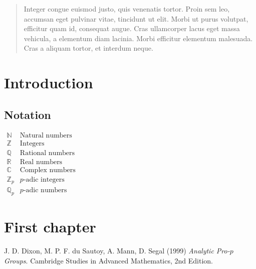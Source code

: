 \documentclass[11pt,a4paper,openany]{memoir}
\begin{document}
\vspace{1cm}

\renewcommand{\abstractname}{Zusammenfassung}
\begin{abstract}
Integer congue euismod justo, quis venenatis tortor. Proin sem leo, accumsan eget pulvinar vitae, tincidunt ut elit. Morbi ut purus volutpat, efficitur quam id, consequat augue. Cras ullamcorper lacus eget massa vehicula, a elementum diam lacinia. Morbi efficitur elementum malesuada. Cras a aliquam tortor, et interdum neque.
\end{abstract}
\vfill
\clearpage

\mainmatter
{} 
\setcounter{page}{5}
\tableofcontents

\chapter{Introduction}

\clearpage

\section{Notation}

$\begin{array}{ll}
\mathbb{N} & \text{Natural numbers} \\
\mathbb{Z} & \text{Integers}\\
\mathbb{Q} & \text{Rational numbers}\\
\mathbb{R} & \text{Real numbers}\\
\mathbb{C} & \text{Complex numbers}\\
\mathbb{Z}_p & \text{$p$-adic integers}\\
\mathbb{Q}_p & \text{$p$-adic numbers}
\end{array}$

\chapter{First chapter}

\begin{thebibliography}{99999999}

	J. D. Dixon, M. P. F. du Sautoy, A. Mann, D. Segal (1999)
	\textit{Analytic Pro-$p$ Groups}.
	Cambridge Studies in Advanced Mathematics,
	2nd Edition.

\end{thebibliography}

\end{document}
